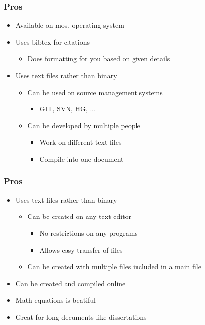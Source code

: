 \begin{frame}
\frametitle{Pros}
    \begin{itemize}
        \item Available on most operating system
        \item Uses bibtex for citations
        \begin{itemize}
            \item Does formatting for you based on given details
        \end{itemize}
        \item Uses text files rather than binary
        \begin{itemize}
            \item Can be used on source management systems
            \begin{itemize}
                \item GIT, SVN, HG, ...
            \end{itemize}
            \item Can be developed by multiple people
            \begin{itemize}
                \item Work on different text files
                \item Compile into one document
            \end{itemize}
        \end{itemize}
    \end{itemize}
\end{frame}


\begin{frame}
\frametitle{Pros}
    \begin{itemize}
        \item Uses text files rather than binary
        \begin{itemize}
            \item Can be created on any text editor
            \begin{itemize}
                \item No restrictions on any programs
                \item Allows easy transfer of files
            \end{itemize}
            \item Can be created with multiple files included in a main file
        \end{itemize}
        \item Can be created and compiled online
        \item Math equations is beatiful
        \item Great for long documents like dissertations
    \end{itemize}
\end{frame}



